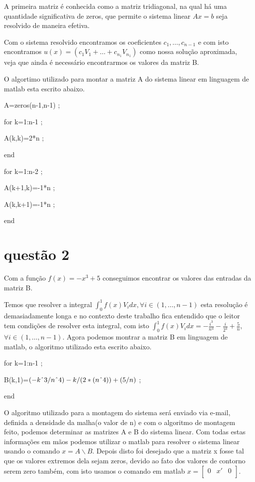 \documentclass[a4paper]{article}
\begin{document}
 
 
 
 A primeira matriz é conhecida como a matriz tridiagonal, na qual há uma quantidade significativa de zeros, que permite o sistema linear \(Ax=b\) seja resolvido de maneira efetiva.
 
 Com o sistema resolvido encontramos os coeficientes \(c_1,\dots, c_{n-1}\) e com isto encontramos \(u(x)=(c_1V_1+ \dots + c_{n_1}V_{n_1})\) como nossa solução aproximada, veja que ainda é necessário encontrarmos os valores da matriz B. 
 
 O algortimo utilizado para montar a matriz A do sistema linear em linguagem de matlab esta escrito abaixo.
  
  A=zeros(n-1,n-1) ;
  
  for k=1:n-1 ;
  
  A(k,k)=2*n ;
  
  end
  
  for k=1:n-2 ;
  
  A(k+1,k)=-1*n ;
  
  A(k,k+1)=-1*n ;
  
  end 
  
  
  

  \section{questão 2}
  
  Com a função \(f(x)=-x^3+5\) conseguimos encontrar os valores das entradas da matriz B.
  
  Temos que resolver a integral \(\int_{0}^{1}f(x)V_idx, \forall i \in (1,\dots, n-1)\) esta resolução é demasiadamente longa e no contexto deste trabalho fica entendido que o leitor tem condições de resolver esta integral, com isto \(\int_{0}^{1}f(x)V_idx=-\frac{i^3}{n^4}-\frac{i}{2^4}+\frac{5}{n}\), \(\forall i \in (1,\dots, n-1)\).
  Agora podemos montrar a matriz B em linguagem de matlab, o algoritmo utilizado esta escrito abaixo.
  
  for k=1:n-1 ;
  
  B(k,1)=\((-k\string^3/n\string^4)-k/(2*(n\string^4))+(5/n)\) ;
  
  end

  O algoritmo utilizado para a montagem do sistema será enviado via e-mail, definida a densidade da malha(o valor de n) e com o algoritmo de montagem feito, podemos determinar as matrizes A e B do sistema linear. Com todas estas informações em mãos podemos utilizar o matlab para resolver o sistema linear usando o comando $x=A \backslash B$. Depois disto foi desejado que a matriz x fosse tal que os valores extremos dela sejam zeros, devido ao fato dos valores de contorno serem zero também, com isto usamos o comando em matlab \(x=\begin{bmatrix}
  0 & x' & 0 \\
  \end{bmatrix}\).
  
\end{document}
